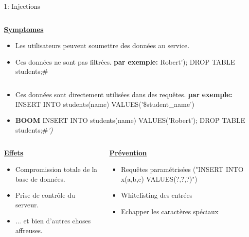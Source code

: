 \documentclass[final,hyperref={pdfpagelabels=false}]{beamer}
\begin{document}
\begin{frame}[t]
\begin{columns}[t]
\begin{column}{.465\textwidth}
\begin{block}{1: Injections}
\begin{columns}[T]
		\begin{column}{.875\textwidth}
			\uline{\textbf{Symptomes}}
			\begin{itemize}
			\item Les utilisateurs peuvent soumettre des données au service.
			\item Ces données ne sont pas filtrées. \textbf{par exemple:} Robert'); DROP TABLE students;\# 
			\end{itemize}
		\end{column}
	\end{columns}
	\begin{itemize}
		\item Ces données sont directement utilisées dans des requêtes. \textbf{par exemple:} INSERT INTO students(name) VALUES('\$student\_name')
		\item \textbf{BOOM} INSERT INTO students(name) VALUES('Robert'); DROP TABLE students;\#\textit{')}
	\end{itemize}

	\begin{columns}[T]
	\begin{column}{.5\textwidth} %
	\vfill
	\uline{\textbf{Effets}}
	\begin{itemize}
		\item Compromission totale de la base de données.
		\item Prise de contrôle du serveur.
		\item ... et bien d'autres choses affreuses.
	\end{itemize}
		\end{column}

	\begin{column}{.5\textwidth} %
		\vfill
		\uline{\textbf{Prévention}}
		\begin{itemize}
			\item Requêtes paramétrisées ("INSERT INTO x(a,b,c) VALUES(?,?,?)")
			\item Whitelisting des entrées 
			\item Echapper les caractères spéciaux
		\end{itemize}
	\end{column}
	\end{columns}

\end{block}

            

\end{column}
\end{columns}
\end{frame}
\end{document}
